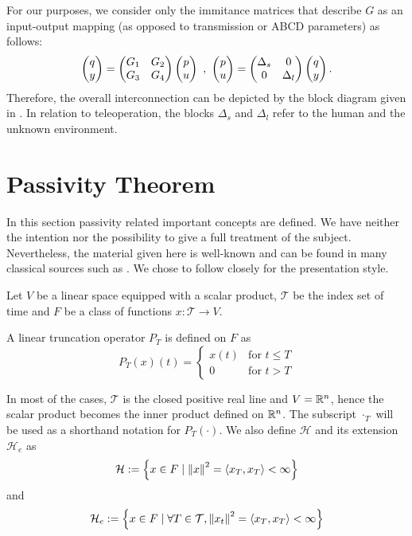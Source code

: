 For our purposes, we consider only the immitance 
matrices that describe $G$ as an input-output mapping (as opposed to transmission or ABCD parameters) as {follows}:
\begin{equation}
\begin{pmatrix}q\\y\end{pmatrix}=\begin{pmatrix}G_1 &G_2\\G_3 &G_4\end{pmatrix}\begin{pmatrix}p\\u\end{pmatrix} \ , \ \begin{pmatrix}p\\u\end{pmatrix}=\begin{pmatrix}\Delta_s &0\\0&\Delta_l\end{pmatrix} \begin{pmatrix}q\\y\end{pmatrix}.
\end{equation}
Therefore, the overall interconnection can be {depicted} by the block diagram given in . 
In relation to teleoperation, the {blocks} $\Delta_s$ and $\Delta_l$ refer to the human and the unknown environment. 


\section{Passivity Theorem}
In this section passivity related important concepts are defined. We have neither the intention nor the possibility to give a full 
treatment of the subject. Nevertheless, the material given here is well-known and can be found in many classical sources such as
\cite{hillmoylan77,desvid,vdschaftbook}. We chose to follow closely \cite{desvid} for the presentation style. 

Let $V$ be a linear space equipped with a scalar product, $\mathcal{T}$ be the index set of time and $F$ be a class of functions 
$x:\mathcal{T}\to V$.
\begin{define} A linear truncation operator $P_T$ is defined on $F$ as 
\begin{equation}
P_T(x)(t) = \begin{cases} x(t) &\text{for } t\leq T\\ 0 &\text{for } t>T\end{cases}
\label{eq:apdx:trunc}
\end{equation}
\end{define}

In most of the cases, $\mathcal{T}$ is the closed positive real line and $V=\mathbb{R}^n$, hence the scalar product becomes the inner product 
defined on $\mathbb{R}^n$. The subscript ${\cdot}_T$ will be used as a shorthand notation for $P_T(\cdot)$. We also define $\mathcal{H}$ 
and its extension $\mathcal{H}_e$ as 
\[
\mathcal{H} := \left\{ x\in F\mid \displaystyle \left\| x \right\|^2=\langle x_T,x_T \rangle<\infty \right\}
\]
and
\[
\mathcal{H}_e := \left\{ x\in F\mid \forall T\in\mathcal{T}, \displaystyle \left\| x_t \right\|^2=\langle x_T,x_T \rangle<\infty \right\}
\]



